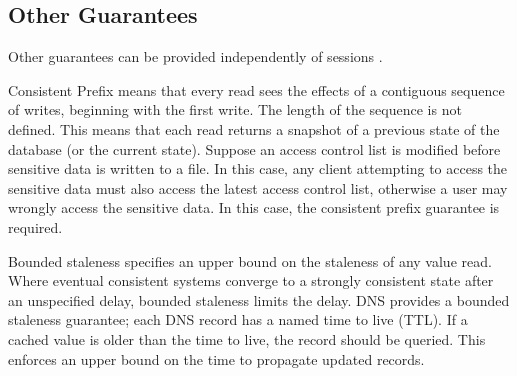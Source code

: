 \documentclass[12pt,a4paper,twoside,openany]{report}
\begin{document}
\subsection*{Other Guarantees}

Other guarantees can be provided independently of sessions \cite{terry2013}.

\begin{description}
\item{Consistent Prefix} means that every read sees the effects of a contiguous sequence of writes, beginning with the first write. The length of the sequence is not defined. This means that each read returns a snapshot of a previous state of the database (or the current state). Suppose an access control list is modified before sensitive data is written to a file. In this case, any client attempting to access the sensitive data must also access the latest access control list, otherwise a user may wrongly access the sensitive data. In this case, the consistent prefix guarantee is required. %

\item{Bounded staleness} specifies an upper bound on the staleness of any value read. Where eventual consistent systems converge to a strongly consistent state after an unspecified delay, bounded staleness limits the delay. DNS provides a bounded staleness guarantee; each DNS record has a named time to live (TTL). If a cached value is older than the time to live, the record should be queried. This enforces an upper bound on the time to propagate updated records. %



\end{description}
\end{document}
